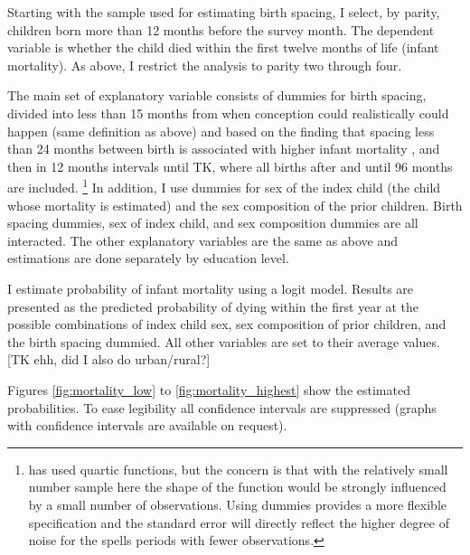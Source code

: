 \documentclass[12pt,letterpaper]{article}
\begin{document}
Starting with the sample used for estimating birth spacing, I select, by
parity, children born more than 12 months before the survey month.
The dependent variable is whether the child died within the first twelve
months of life (infant mortality).
As above, I restrict the analysis to parity two through four.

The main set of explanatory variable consists of dummies for birth spacing,
divided into less than 15 months from when conception could realistically
could happen (same definition as above) and based on the finding that 
spacing less than 24 months between birth is associated with higher
infant mortality \citep{Molitoris2019}, and then in 12 months intervals
until TK, where all births after and until 96 months are included.%
\footnote{
\citet{Molitoris2019} has used quartic functions, but the concern is
that with the relatively small number sample here the shape
of the function would be strongly influenced by a small number of
observations.
Using dummies provides a more flexible specification and the standard
error will directly reflect the higher degree of noise for the
spells periods with fewer observations.
}
In addition, I use dummies for sex of the index child (the child whose 
mortality is estimated) and the sex composition of the prior children.
Birth spacing dummies, sex of index child, and sex composition dummies
are all interacted.
The other explanatory variables are the same as above and estimations
are done separately by education level.

I estimate probability of infant mortality using a logit model.
Results are presented as the predicted probability of dying within the
first year at the possible combinations of index child sex, sex composition
of prior children, and the birth spacing dummied.
All other variables are set to their average values.
[TK ehh, did I also do urban/rural?]

Figures \ref{fig:mortality_low} to \ref{fig:mortality_highest} show the 
estimated probabilities.
To ease legibility all confidence intervals are suppressed
(graphs with confidence intervals are available on request).
\end{document}
